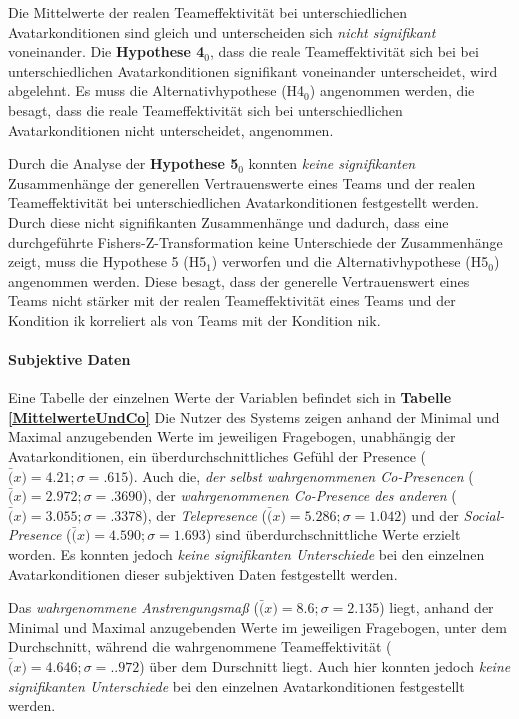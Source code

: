 \documentclass[a4paper,11pt]{article}%
\renewcommand{\\}{\vspace*{0.5\baselineskip} \newline}
\begin{document}
Die Mittelwerte der realen Teameffektivität bei unterschiedlichen Avatarkonditionen sind gleich und unterscheiden sich \textit{nicht signifikant} voneinander. Die \textbf{Hypothese 4$_{0}$}, dass die reale Teameffektivität sich bei bei unterschiedlichen Avatarkonditionen signifikant voneinander unterscheidet, wird abgelehnt. Es muss die Alternativhypothese (H4$_{0}$) angenommen werden, die besagt, dass die reale Teameffektivität sich bei unterschiedlichen Avatarkonditionen nicht unterscheidet, angenommen.\newline

Durch die Analyse der \textbf{Hypothese 5$_{0}$} konnten \textit{keine signifikanten} Zusammenhänge der generellen Vertrauenswerte eines Teams und der realen Teameffektivität bei unterschiedlichen Avatarkonditionen festgestellt werden. Durch diese nicht signifikanten Zusammenhänge und dadurch, dass eine durchgeführte Fishers-Z-Transformation keine Unterschiede der Zusammenhänge zeigt, muss die Hypothese 5 (H5$_{1}$) verworfen und die Alternativhypothese (H5$_{0}$) angenommen werden. Diese besagt, dass der generelle Vertrauenswert eines Teams nicht stärker mit der realen Teameffektivität eines Teams und der Kondition \ac{ik} korreliert als von Teams mit der Kondition \ac{nik}.

\paragraph{Subjektive Daten}
Eine Tabelle der einzelnen Werte der Variablen befindet sich in \textbf{Tabelle \ref{MittelwerteUndCo} }
Die Nutzer des Systems zeigen anhand der Minimal und Maximal anzugebenden Werte im jeweiligen Fragebogen, unabhängig der Avatarkonditionen, ein überdurchschnittliches Gefühl der Presence  ($\bar(x)=4.21; \sigma=.615$). Auch die, \textit{der selbst wahrgenommenen Co-Presencen} ($\bar(x)=2.972; \sigma=.3690$), der \textit{wahrgenommenen Co-Presence des anderen} ($\bar(x)=3.055; \sigma=.3378$), der \textit{Telepresence} ($\bar(x)=5.286; \sigma=1.042$) und der \textit{Social-Presence} ($\bar(x)=4.590; \sigma=1.693$) sind überdurchschnittliche Werte erzielt worden.
Es konnten jedoch \textit{keine signifikanten Unterschiede} bei den einzelnen Avatarkonditionen dieser subjektiven Daten festgestellt werden.

Das \textit{wahrgenommene Anstrengungsmaß} ($\bar(x)=8.6; \sigma=2.135$) liegt, anhand der Minimal und Maximal anzugebenden Werte im jeweiligen Fragebogen, unter dem Durchschnitt, während die wahrgenommene Teameffektivität ($\bar(x)=4.646; \sigma=..972$) über dem Durschnitt liegt. Auch hier konnten jedoch \textit{keine signifikanten Unterschiede} bei den einzelnen Avatarkonditionen festgestellt werden.
\end{document}
